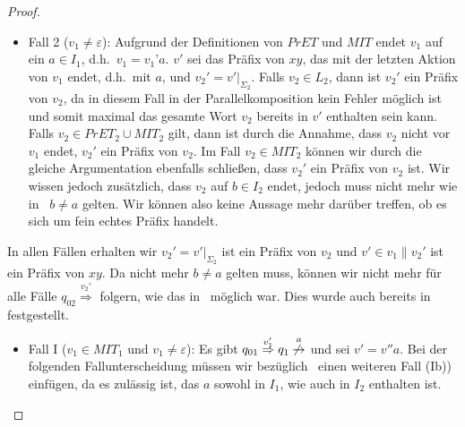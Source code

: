\begin{proof}
\begin{itemize}
    \item Fall 2 ($v_1\neq\varepsilon$): Aufgrund der Definitionen von $PrET$
      und $MIT$ endet $v_1$ auf ein $a\in I_1$, d.h.\ $v_1=v_1’a$. $v'$ sei das
      Präfix von $xy$, das mit der letzten Aktion von $v_1$ endet, d.h.\ mit
      $a$, und $v_2'=v'|_{\Sigma _{2}}$. Falls $v_2\in L_2$, dann ist
      $v_2'$ ein Präfix von $v_2$, da in diesem Fall in der
      Parallelkomposition kein Fehler möglich ist und somit maximal das gesamte Wort $v_2$ bereits in
      $v'$ enthalten sein kann. Falls $v_2\in
      PrET_2\cup MIT_2$ gilt, dann ist durch die Annahme, dass $v_2$ nicht vor
      $v_1$ endet, $v_2'$ ein Präfix von $v_2$. Im Fall $v_2\in MIT_2$ können
      wir durch die gleiche Argumentation ebenfalls schließen, dass $v_2'$ ein
      Präfix von $v_2$ ist. Wir wissen jedoch zusätzlich, dass $v_2$ auf $b\in
      I_2$ endet, jedoch muss nicht mehr wie in~\cite{Vogler2014EIO} $b\neq a$
      gelten. Wir können also keine Aussage mehr darüber treffen, ob es sich um
      fein echtes Präfix handelt.
  \end{itemize}
  In allen Fällen erhalten wir $v_2'=v'|_{\Sigma _2}$ ist ein Präfix von $v_2$
  und $v'\in v_1\| v_2'$ ist ein Präfix von $xy$. Da nicht mehr $b\neq a$
  gelten muss, können wir nicht mehr für alle Fälle
  $q_{02}\overset{v_2'}{\Rightarrow}$ folgern, wie das in~\cite{Vogler2014EIO}
  möglich war. Dies wurde auch bereits in~\cite{Schlosser2012BA} festgestellt.
  \begin{itemize}
    \item Fall I ($v_1\in MIT_1$ und $v_1\neq\varepsilon$): Es gibt $q_{01}
      \overset{v_1'}{\Rightarrow}q_1
      \overset{a}{\not{\hspace{-0.1cm}\rightarrow}}$ und sei $v'=v''a$. Bei der
      folgenden Fallunterscheidung müssen wir bezüglich~\cite{Vogler2014EIO}
      einen weiteren Fall (Ib)) einfügen, da es zulässig ist, das $a$ sowohl in
      $I_1$, wie auch in $I_2$ enthalten ist.
\end{itemize}
\end{proof}
